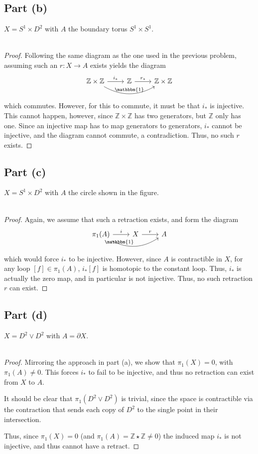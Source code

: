 \documentclass[fontsize=11pt]{scrartcl} %
\numberwithin{equation}{section} %
\numberwithin{figure}{section} %
\numberwithin{table}{section} %
\newcommand{\Z}{\mathbb{Z}}
\begin{document}
\subsection*{Part (b)}
$X=S^1\times D^2$ with $A$ the boundary torus $S^1\times S^1$.
\\
\\
\begin{proof}
    Following the same diagram as the one used in the previous problem, assuming
    such an $r:X\to A$ exists yields the diagram
    \[
\begin{tikzcd}
    \Z\times\Z\arrow{r}{i_*}\arrow[bend right]{rr}{\mathbbm{1}}
    &\Z\arrow{r}{r_*} &\Z\times \Z
\end{tikzcd}
    \]
    which commutes. However, for this to commute, it must be that $i_*$ is
    injective. This cannot happen, however, since $\Z\times \Z$ has two
    generators, but $\Z$ only has one. Since an injective map has to map
    generators to generators, $i_*$ cannot be injective, and the diagram cannot
    commute, a contradiction. Thus, no such $r$ exists.
\end{proof}
\subsection*{Part (c)}
$X=S^1\times D^2$ with $A$ the circle shown in the figure.
\\
\\
\begin{proof}
    Again, we assume that such a retraction exists, and form the diagram
    \[
\begin{tikzcd}
    \pi_1(A)\arrow{r}{i}\arrow[bend right]{rr}{\mathbbm{1}} &X\arrow{r}{r} &A
\end{tikzcd}
    \]
    which would force $i_*$ to be injective. However, since $A$ is contractible
    in $X$, for any loop $[f]\in\pi_1(A)$, $i_*[f]$ is homotopic to the constant
    loop. Thus, $i_*$ is actually the zero map, and in particular is not
    injective. Thus, no such retraction $r$ can exist.
\end{proof}
\subsection*{Part (d)}
$X=D^2\vee D^2$ with $A = \partial X$.
\\
\\
\begin{proof}
    Mirroring the approach in part (a), we show that $\pi_1(X)=0$, with
    $\pi_1(A)\neq 0$. This forces $i_*$ to fail to be injective, and thus no
    retraction can exist from $X$ to $A$.

    It should be clear that $\pi_1(D^2\vee D^2)$ is trivial, since the space is
    contractible via the contraction that sends each copy of $D^2$ to the single
    point in their intersection.

    Thus, since $\pi_1(X) = 0$ (and $\pi_1(A) = \Z\star\Z\neq 0$) the induced
    map $i_*$ is not injective, and thus cannot have a retract.
\end{proof}
\end{document}
